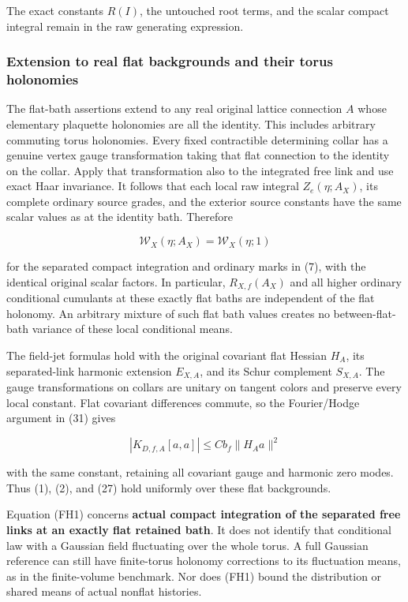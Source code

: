 \documentclass[
  11pt,
]{article}
\begin{document}
The exact constants \(R(I)\), the untouched root terms, and the scalar
compact integral remain in the raw generating expression.

\hypertarget{extension-to-real-flat-backgrounds-and-their-torus-holonomies}{%
\subsubsection{Extension to real flat backgrounds and their torus
holonomies}\label{extension-to-real-flat-backgrounds-and-their-torus-holonomies}}

The flat-bath assertions extend to any real original lattice connection
\(A\) whose elementary plaquette holonomies are all the identity. This
includes arbitrary commuting torus holonomies. Every fixed contractible
determining collar has a genuine vertex gauge transformation taking that
flat connection to the identity on the collar. Apply that transformation
also to the integrated free link and use exact Haar invariance. It
follows that each local raw integral \(Z_e(\eta;A_X)\), its complete
ordinary source grades, and the exterior source constants have the same
scalar values as at the identity bath. Therefore

\[
 \mathcal W_X(\eta;A_X)=\mathcal W_X(\eta;1)
                                                        \tag{FH1}
\]

for the separated compact integration and ordinary marks in (7), with
the identical original scalar factors. In particular, \(R_{X,f}(A_X)\)
and all higher ordinary conditional cumulants at these exactly flat
baths are independent of the flat holonomy. An arbitrary mixture of such
flat bath values creates no between-flat-bath variance of these local
conditional means.

The field-jet formulas hold with the original covariant flat Hessian
\(H_A\), its separated-link harmonic extension \(E_{X,A}\), and its
Schur complement \(S_{X,A}\). The gauge transformations on collars are
unitary on tangent colors and preserve every local constant. Flat
covariant differences commute, so the Fourier/Hodge argument in (31)
gives

\[
 |K_{D,f,A}[a,a]|\le Cb_f\|H_Aa\|^2
\]

with the same constant, retaining all covariant gauge and harmonic zero
modes. Thus (1), (2), and (27) hold uniformly over these flat
backgrounds.

Equation (FH1) concerns \textbf{actual compact integration of the
separated free links at an exactly flat retained bath}. It does not
identify that conditional law with a Gaussian field fluctuating over the
whole torus. A full Gaussian reference can still have finite-torus
holonomy corrections to its fluctuation means, as in the finite-volume
benchmark. Nor does (FH1) bound the distribution or shared means of
actual nonflat histories.
\end{document}
